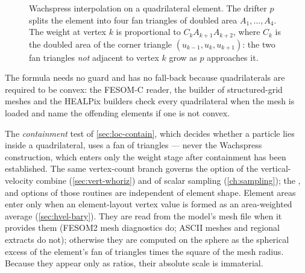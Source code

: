 \begin{figure}[t]
\centering
{}
\caption{Wachspress interpolation on a quadrilateral element. The drifter $p$ splits the element into
four fan triangles of doubled area $A_1,\dots,A_4$. The weight at vertex $k$ is proportional to
$C_k A_{k+1} A_{k+2}$, where $C_k$ is the doubled area of the corner triangle $(u_{k-1},u_k,u_{k+1})$:
the two fan triangles \emph{not} adjacent to vertex $k$ grow as $p$ approaches it.}
\label{fig:wachspress}
\end{figure}

The formula needs no guard and has no fall-back because quadrilaterals are required to be convex:
the FESOM-C reader, the builder of structured-grid meshes and the HEALPix builders check every
quadrilateral when the mesh is loaded and name the offending elements if one is not convex.

The \emph{containment} test of \cref{sec:loc-contain}, which decides whether a particle lies inside a
quadrilateral, uses a fan of triangles --- never the Wachspress construction, which enters only the
weight stage after containment has been established. The same vertex-count branch governs the
 option of the vertical-velocity combine (\cref{sec:vert-whoriz}) and of scalar
sampling (\cref{ch:sampling}); the ,  and  options of those
routines are independent of element shape. Element areas enter only when an element-layout vertex
value is formed as an area-weighted average (\cref{sec:hvel-bary}). They are read from the model's mesh
file when it provides them (FESOM2 mesh diagnostics do; ASCII meshes and regional extracts do not); otherwise they are computed on the sphere as the
spherical excess of the element's fan of triangles times the square of the mesh radius. Because they
appear only as ratios, their absolute scale is immaterial.

